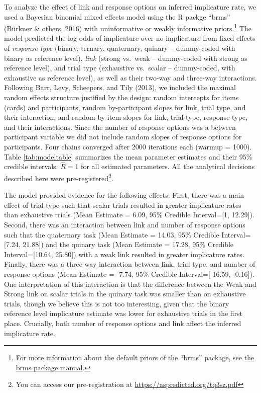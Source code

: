 \documentclass[man]{apa6}
\theoremstyle{definition}
\theoremstyle{definition}
\theoremstyle{definition}
\theoremstyle{remark}
\begin{document}
To analyze the effect of link and response options on inferred
implicature rate, we used a Bayesian binomial mixed effects model using
the R packge \enquote{brms} (Bürkner \& others, 2016) with uninformative
or weakly informative priors.\footnote{For more information about the
  default priors of the \enquote{brms} package, see
  \href{ftp://cran.r-project.org/pub/R/web/packages/brms/brms.pdf}{the
  brms package manual}.} The model predicted the log odds of implicature
over no implicature from fixed effects of \emph{response type} (binary,
ternary, quaternary, quinary -- dummy-coded with binary as reference
level), \emph{link} (strong vs.~weak -- dummy-coded with strong as
reference level), and trial type (exhaustive vs.~scalar -- dummy-coded,
with exhaustive as reference level), as well as their two-way and
three-way interactions. Following Barr, Levy, Scheepers, and Tily
(2013), we included the maximal random effects structure justified by
the design: random intercepts for items (cards) and participants, random
by-participant slopes for link, trial type, and their interaction, and
random by-item slopes for link, trial type, response type, and their
interactions. Since the number of response options was a between
participant variable we did not include random slopes of response
options for participants. Four chains converged after 2000 iterations
each (warmup = 1000). Table \ref{tab:modeltable} summarizes the mean
parameter estimates and their 95\% credible intervals. \(\hat{R}=1\) for
all estimated parameters. All the analytical decisions described here
were pre-registered\footnote{You can access our pre-registration at
  \url{https://aspredicted.org/tq3sz.pdf}}.

The model provided evidence for the following effects: First, there was
a main effect of trial type such that scalar trials resulted in greater
implicature rates than exhaustive trials (Mean Estimate = 6.09, 95\%
Credible Interval={[}1, 12.29{]}). Second, there was an interaction
between link and number of response options such that the quaternary
task (Mean Estimate = 14.03, 95\% Credible Interval={[}7.24, 21.88{]})
and the quinary task (Mean Estimate = 17.28, 95\% Credible
Interval={[}10.64, 25.80{]}) with a weak link resulted in greater
implicature rates. Finally, there was a three-way interaction between
link, trial type, and number of response options (Mean Estimate = -7.74,
95\% Credible Interval={[}-16.59, -0.16{]}). One interpretation of this
interaction is that the difference between the Weak and Strong link on
scalar trials in the quinary task was smaller than on exhaustive trials,
though we believe this is not too interesting, given that the binary
reference level implicature estimate was lower for exhaustive trials in
the first place. Crucially, both number of response options and link
affect the inferred implicature rate.
\end{document}
